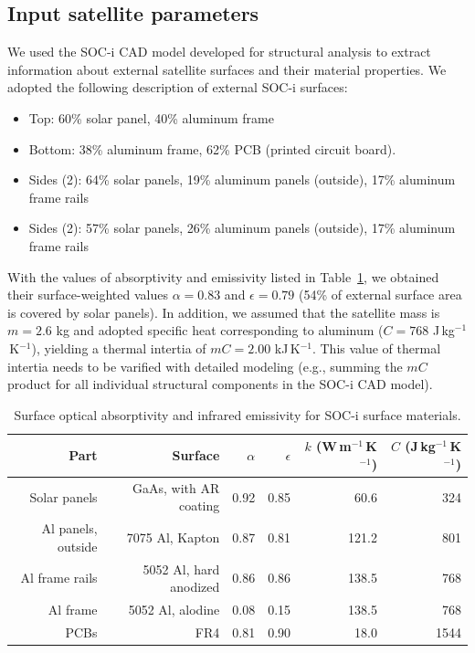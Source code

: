 \documentclass[]{aastex62}
\begin{document}
\subsection{Input satellite parameters}

We used the SOC-i CAD model developed for structural analysis to extract information about
external satellite surfaces and their material properties. We adopted the following description 
of external SOC-i surfaces: 
\begin{itemize}
\item  Top: 60\% solar panel, 40\% aluminum frame
\item  Bottom: 38\% aluminum frame, 62\% PCB (printed circuit board). 
\item  Sides (2): 64\% solar panels, 19\% aluminum panels (outside), 17\% aluminum frame rails
\item  Sides (2): 57\% solar panels, 26\% aluminum panels (outside), 17\% aluminum frame rails
\end{itemize}

With the values of absorptivity and emissivity listed in Table~\ref{tab:inputsAbsEmiss}, we obtained
their surface-weighted values $\alpha=0.83$ and $\epsilon=0.79$ (54\% of external surface area
is covered by solar panels). In addition, we assumed that the satellite mass is $m=2.6$ kg and 
adopted specific heat corresponding to aluminum ($C=768$  J\,kg$^{-1}$\,K$^{-1}$), yielding a
thermal intertia of $mC = 2.00$ kJ\,K$^{-1}$. This value of thermal intertia needs to be varified with 
detailed modeling (e.g., summing the $mC$ product for all individual structural components
in the SOC-i CAD model). 

\begin{table}[t]
	\centering
	\caption{Surface optical absorptivity and infrared emissivity for SOC-i surface materials. }
	\label{tab:inputsAbsEmiss}
	\begin{tabular}{r|r|r|r|r|r} %
		\hline
  	              Part        &                Surface          &    $\alpha$  &   $\epsilon$    &   $k$ (W\,m$^{-1}$\,K$^{-1}$)   &  $C$ (J\,kg$^{-1}$\,K$^{-1}$)  \\
	  	\hline
         Solar panels        &       GaAs, with AR coating  &           0.92      &          0.85      &   60.6    &      324   \\  
     Al panels, outside   &     7075 Al, Kapton             &           0.87       &         0.81       &  121.2   &    801   \\ 
          Al frame rails    &       5052 Al, hard anodized &          0.86        &        0.86      &    138.5   &    768    \\  
                Al frame      &       5052 Al, alodine            &          0.08        &        0.15       &   138.5   &    768    \\
                PCBs            &               FR4                        &           0.81       &         0.90        &   18.0  &    1544  \\ 
 		\hline     
	\end{tabular} 
\end{table}
 
\end{document}
